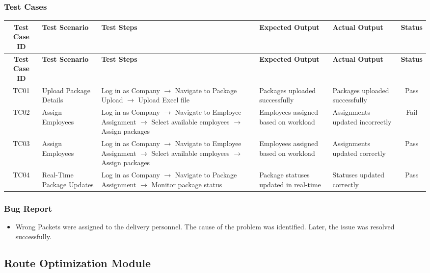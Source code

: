 \documentclass{article}
\begin{document}
\subsubsection{Test Cases}
\small
\setlength\LTleft{0pt}
\setlength\LTright{0pt}
\begin{longtable}{|c|p{2.8cm}|p{4cm}|p{2.8cm}|p{2.8cm}|c|}
\hline
\textbf{Test Case ID} & \textbf{Test Scenario} & \textbf{Test Steps} & \textbf{Expected Output} & \textbf{Actual Output} & \textbf{Status} \\
\hline
\endfirsthead
\hline
\textbf{Test Case ID} & \textbf{Test Scenario} & \textbf{Test Steps} & \textbf{Expected Output} & \textbf{Actual Output} & \textbf{Status} \\
\hline
\endhead
TC01 & Upload Package Details & Log in as Company $\rightarrow$ Navigate to Package Upload $\rightarrow$ Upload Excel file & Packages uploaded successfully & Packages uploaded successfully & Pass \\
\hline
TC02 & Assign Employees & Log in as Company $\rightarrow$ Navigate to Employee Assignment $\rightarrow$ Select available employees $\rightarrow$ Assign packages & Employees assigned based on workload & Assignments updated incorrectly & Fail \\
\hline
TC03 & Assign Employees & Log in as Company $\rightarrow$ Navigate to Employee Assignment $\rightarrow$ Select available employees $\rightarrow$ Assign packages & Employees assigned based on workload & Assignments updated correctly & Pass \\
\hline
TC04 & Real-Time Package Updates & Log in as Company $\rightarrow$ Navigate to Package Assignment $\rightarrow$ Monitor package status & Package statuses updated in real-time & Statuses updated correctly & Pass \\
\hline
\end{longtable}

\subsubsection{Bug Report}
\begin{itemize}
    \item Wrong Packets were assigned to the delivery personnel. The cause of the problem was identified. Later, the issue was resolved successfully.
\end{itemize}

\newpage

\subsection{Route Optimization Module}
\end{document}
